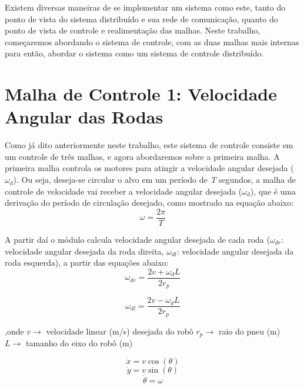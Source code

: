 Existem diversas maneiras de se implementar um sistema como este, tanto do ponto de vista do sistema distribuído e sua rede de comunicação, quanto do ponto de vista de controle e realimentação das malhas. Neste trabalho, começaremos abordando o sistema de controle, com as duas malhas mais internas para então, abordar o sistema como um sistema de controle distribuído.
 
\section{Malha de Controle 1: Velocidade Angular das Rodas}
\label{sec:malha1 } 
Como já dito anteriormente neste trabalho, este sistema de controle consiste em um controle de três malhas, e agora abordaremos sobre a primeira malha. A primeira malha controla os motores para atingir a velocidade angular desejada ($ \omega _{d} $). Ou seja, deseja-se circular o alvo em um período de \emph{T} segundos, a malha de controle de velocidade vai receber a velocidade angular desejada ($ \omega _{d} $), que é uma derivação do período de circulação desejado, como mostrado na equação abaixo:
\begin{equation}
\omega = \dfrac{2\pi}{T}
\label{eq:velocangular}
\end{equation}

A partir daí o módulo calcula velocidade angular desejada de cada roda ($ \omega _{dr} $: velocidade angular desejada da roda direita, $ \omega _{dl} $: velocidade angular desejada da roda esquerda), a partir das equações abaixo:
\begin{equation}
\omega_{dr} = \dfrac{2v + \omega_{d}L}{2r_{p}}	
\label{eq:velocangulardireita}
\end{equation} 

\begin{equation}
\omega_{dl} = \dfrac{2v - \omega_{d}L}{2r_{p}}	
\label{eq:velocangularesquerda}
\end{equation} 

,onde $v \rightarrow$ velocidade linear (m/s) desejada do robô 
      $r_{p} \rightarrow$ raio do pneu (m)
	  $L \rightarrow$ tamanho do eixo do robô (m)

\begin{equation}
\dot{x} = v\cos(\theta) 
\label{eq:posiçãox}
\end{equation}
\begin{equation}
\dot{y} = v\sin(\theta)
\label{eq:posiçãoy}
\end{equation}
\begin{equation}
\dot{\theta} = \omega
\label{eq:posiçãotheta}
\end{equation}





